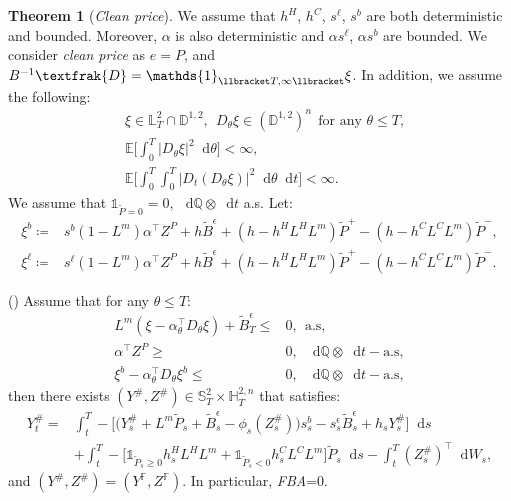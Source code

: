 \documentclass[a4paper, 11pt]{article}              %
\numberwithin{equation}{section}
\theoremstyle{plain}
\newcommand{\dqdt}{\df \dsQ \otimes \df t-\text{a.s}}
\newcommand{\1}{\mathds{1}}
\newcommand{\frD}{\textfrak{D}}
\newcommand{\Bt}{\tilde{B}}
\newcommand{\pt}{\tilde{P}}
\newcommand{\dsE}{\mathbb{E}}
\newcommand{\dsF}{\mathbb{F}}
\newcommand{\dsH}{\mathbb{H}}
\newcommand{\dsQ}{\mathbb{Q}}
\newcommand{\dsL}{\mathbb{L}}
\newcommand{\dsS}{\mathbb{S}}
\newcommand{\dsD}{\mathbb{D}}
\theoremstyle{plain}
\newtheorem{theorem}[thm]{Theorem}
\theoremstyle{definition}
\newtheorem{theorem}{Theorem}
\theoremstyle{plain}
\newcommand*\df{\mathop{}\!\mathrm{d}}
\newcommand{\rom}[1]{\lowercase\expandafter{\romannumeral #1\relax}}
\begin{document}
\begin{theorem}[\textit{Clean price}]\label{thm:clean}
We assume  that $h^H$, $h^C$, $s^\ell$, $s^b$ are both deterministic and
bounded. Moreover, $\alpha$ is also deterministic and $\alpha s^\ell$, $\alpha s^b$ are
bounded. We consider \textit{clean price} as $e = P$, and
$B^{-1}\frD = \1_{\llbracket T, \infty\llbracket}\xi$. In addition, we assume the following:
\begin{eqnarray}
  & \xi \in\dsL_T^2 \cap\dsD^{1, 2},~~ D_\theta\xi \in (\dsD^{1,2})^n~~\text{for any } \theta \leq T,
    \label{thm1:int1}\\
  &\dsE\bigg[\int_{0}^{T}\big|D_\theta \xi\big|^2\df \theta\bigg] <\infty, \label{thm1:int2}\\
  &\dsE\bigg[\int_{0}^{T}\int_{0}^{T}\big|D_t(D_\theta \xi)\big|^2\df \theta \df t\bigg] <\infty.\label{thm1:int3}
\end{eqnarray}
We assume that $\1_{\pt=0} = 0$, $\df \dsQ \otimes \df t$ a.s. Let:
\begin{align}
\xi^b \coloneqq& s^b(1-L^m) \alpha^\top Z^P  +h\Bt^\epsilon+(h-h^HL^HL^m)\pt^+
  -(h-h^CL^CL^m)\pt^-, \nonumber \\
\xi^\ell \coloneqq& s^\ell(1-L^m) \alpha^\top Z^P  +h\Bt^\epsilon+(h-h^HL^HL^m)\pt^+
  -(h-h^CL^CL^m)\pt^-.\nonumber 
\end{align}

(\rom{1}) Assume that for any $\theta \leq T$:
\begin{align}
    L^m(\xi - \alpha_\theta^\top D_\theta\xi) + \Bt^\epsilon_T \leq&0, ~~\text{a.s},\label{thm1:cx}\\
  \alpha^\top Z^P \geq&0, ~~\dqdt,   \label{thm1:czf}\\
  \xi^b - \alpha_\theta^\top D_\theta\xi^b \leq&0, ~~\dqdt,\label{thm1:cxb}
\end{align}
then there exists $(Y^\#, Z^\#) \in \dsS^2_T \times\dsH^{2, n}_T$ that satisfies:
\begin{align}
  Y^\#_t =& \int_{t}^{T} -\bigg[\Big(Y^\#_s +L^m\pt_s+\Bt^\epsilon_s-\phi_s(Z^\#_s)\Big)s^{b}_s-s^\epsilon_s\Bt^\epsilon_s+h_sY^\#_s\bigg]\df s\nonumber\\
  &+\int_{t}^{T}
    -\big[\1_{\pt_s\geq0}h^H_sL^HL^m+\1_{\pt_s<0}h^C_sL^CL^m\big]\pt_s\df s
    -\int_{t}^{T}(Z^\#_s)^\top\df W_s, \nonumber 
\end{align}
and $(Y^\#, Z^\#) = (Y^\dsF, Z^\dsF)$. In particular, \emph{FBA}=$0$.


\end{theorem}
\end{document}
